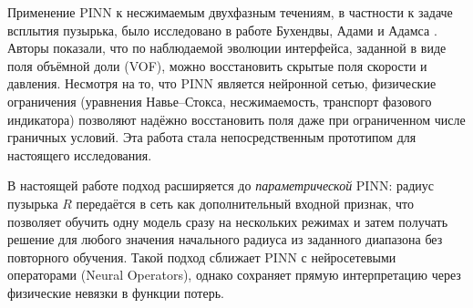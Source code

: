 Применение PINN к несжимаемым двухфазным течениям, в частности к задаче
всплытия пузырька, было исследовано в работе Бухендвы, Адами и Адамса
\cite{Buhendwa2021}. Авторы показали, что по наблюдаемой эволюции интерфейса,
заданной в виде поля объёмной доли (VOF), можно восстановить скрытые поля
скорости и давления. Несмотря на то, что PINN является нейронной сетью,
физические ограничения (уравнения Навье--Стокса, несжимаемость,
транспорт фазового индикатора) позволяют надёжно восстановить поля даже
при ограниченном числе граничных условий. Эта работа стала непосредственным
прототипом для настоящего исследования.

В настоящей работе подход расширяется до \emph{параметрической} PINN: радиус
пузырька $R$ передаётся в сеть как дополнительный входной признак, что
позволяет обучить одну модель сразу на нескольких режимах и затем получать
решение для любого значения начального радиуса из заданного диапазона без повторного обучения.
Такой подход сближает PINN с нейросетевыми операторами (Neural Operators),
однако сохраняет прямую интерпретацию через физические невязки в функции
потерь.